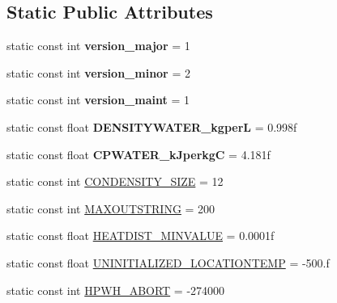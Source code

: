 \subsection*{Static Public Attributes}
\begin{DoxyCompactItemize}
\item 
\hypertarget{class_h_p_w_h_a404694da361f91cab76c434bc2e8aba7}{static const int {\bfseries version\-\_\-major} = 1}\label{class_h_p_w_h_a404694da361f91cab76c434bc2e8aba7}

\item 
\hypertarget{class_h_p_w_h_a4d21de98801ba96190a10fce9f7e0007}{static const int {\bfseries version\-\_\-minor} = 2}\label{class_h_p_w_h_a4d21de98801ba96190a10fce9f7e0007}

\item 
\hypertarget{class_h_p_w_h_af02ab978efb608dbcb3010f51fec5bee}{static const int {\bfseries version\-\_\-maint} = 1}\label{class_h_p_w_h_af02ab978efb608dbcb3010f51fec5bee}

\item 
\hypertarget{class_h_p_w_h_ad731cfda8428fb584d308f98c2eb329a}{static const float {\bfseries D\-E\-N\-S\-I\-T\-Y\-W\-A\-T\-E\-R\-\_\-kgper\-L} = 0.\-998f}\label{class_h_p_w_h_ad731cfda8428fb584d308f98c2eb329a}

\item 
\hypertarget{class_h_p_w_h_abf1c9972b0dc6bfe5ec90042d03db7f4}{static const float {\bfseries C\-P\-W\-A\-T\-E\-R\-\_\-k\-Jperkg\-C} = 4.\-181f}\label{class_h_p_w_h_abf1c9972b0dc6bfe5ec90042d03db7f4}

\item 
static const int \hyperlink{class_h_p_w_h_a545073febf9422e346d62d27093b8eb8}{C\-O\-N\-D\-E\-N\-S\-I\-T\-Y\-\_\-\-S\-I\-Z\-E} = 12
\item 
static const int \hyperlink{class_h_p_w_h_aee834cec1de7483ecf642d310a7da75f}{M\-A\-X\-O\-U\-T\-S\-T\-R\-I\-N\-G} = 200
\item 
static const float \hyperlink{class_h_p_w_h_a17bd9d54d4aa54393078e4be104675dd}{H\-E\-A\-T\-D\-I\-S\-T\-\_\-\-M\-I\-N\-V\-A\-L\-U\-E} = 0.\-0001f
\item 
static const float \hyperlink{class_h_p_w_h_aaa8fb3333f8cb5caf7ef0c92d3d8f998}{U\-N\-I\-N\-I\-T\-I\-A\-L\-I\-Z\-E\-D\-\_\-\-L\-O\-C\-A\-T\-I\-O\-N\-T\-E\-M\-P} = -\/500.f
\item 
static const int \hyperlink{class_h_p_w_h_a727a9e272cf7ac3564ebd67bfb8ed063}{H\-P\-W\-H\-\_\-\-A\-B\-O\-R\-T} = -\/274000
\end{DoxyCompactItemize}


